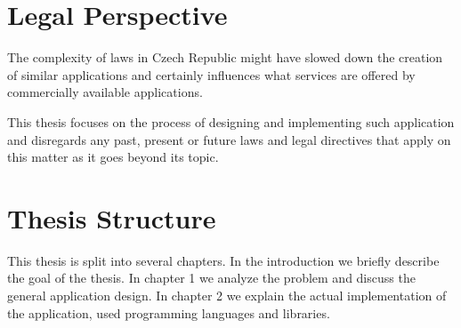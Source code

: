 \section*{Legal Perspective}

The complexity of laws in Czech Republic might have slowed down the creation of similar applications and certainly influences what services are offered by commercially available applications.
\par
This thesis focuses on the process of designing and implementing such application and disregards any past, present or future laws and legal directives that apply on this matter as it goes beyond its topic.

\section*{Thesis Structure}

This thesis is split into several chapters. In the introduction we briefly describe the goal of the thesis. In chapter 1 we analyze the problem and discuss the general application design. In chapter 2 we explain the actual implementation of the application, used programming languages and libraries.




